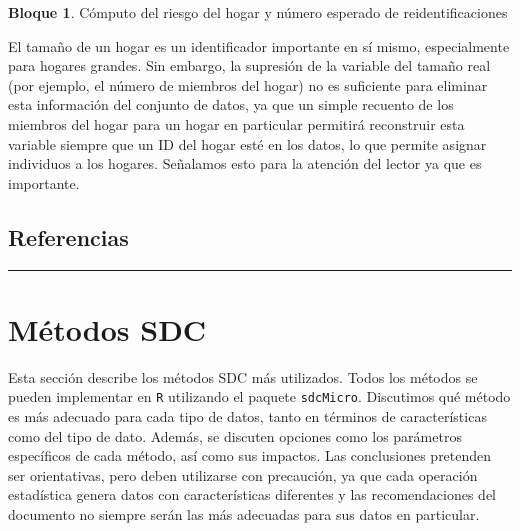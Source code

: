 \documentclass[
]{book}
\newenvironment{Shaded}{\begin{snugshade}}{\end{snugshade}}
\newcommand{\CommentTok}[1]{\textcolor[rgb]{0.56,0.35,0.01}{\textit{#1}}}
\newcommand{\NormalTok}[1]{#1}
\newcommand{\SpecialCharTok}[1]{\textcolor[rgb]{0.00,0.00,0.00}{#1}}
\theoremstyle{definition}
\theoremstyle{definition}
\newtheorem{example}{Bloque}[chapter]
\theoremstyle{definition}
\theoremstyle{definition}
\theoremstyle{remark}
\begin{document}
\begin{example}
\protect\hypertarget{exm:bloqueMR12}{}\label{exm:bloqueMR12}Cómputo del riesgo del hogar y número esperado de reidentificaciones
\end{example}

\begin{Shaded}
\end{Shaded}

El tamaño de un hogar es un identificador importante en sí mismo, especialmente para hogares grandes. Sin embargo, la supresión de la variable del tamaño real (por ejemplo, el número de miembros del hogar) no es suficiente para eliminar esta información del conjunto de datos, ya que un simple recuento de los miembros del hogar para un hogar en particular permitirá reconstruir esta variable siempre que un ID del hogar esté en los datos, lo que permite asignar individuos a los hogares. Señalamos esto para la atención del lector ya que es importante.

\hypertarget{referencias}{%
\section{Referencias}\label{referencias}}

\begin{center}\rule{0.5\linewidth}{0.5pt}\end{center}

\hypertarget{muxe9todos-sdc}{%
\chapter{Métodos SDC}\label{muxe9todos-sdc}}

Esta sección describe los métodos SDC más utilizados. Todos los métodos se pueden implementar en \texttt{R} utilizando el paquete \texttt{sdcMicro}. Discutimos qué método es más adecuado para cada tipo de datos, tanto en términos de características como del tipo de dato. Además, se discuten opciones como los parámetros específicos de cada método, así como sus impactos. Las conclusiones pretenden ser orientativas, pero deben utilizarse con precaución, ya que cada operación estadística genera datos con características diferentes y las recomendaciones del documento no siempre serán las más adecuadas para sus datos en particular.
\end{document}
